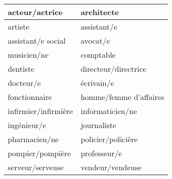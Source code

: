 \documentclass{article}
\date{}
\newcommand{\tabrowEnd}{\rule{0pt}{45pt}\\}
\begin{document}
  \centering
  \noindent
  {\LARGE
    \begin{tabular}{| p{} | p{} |}
      \hline
      acteur/actrice       & architecte \tabrowEnd
      \hline
      artiste              & assistant/e \tabrowEnd
      \hline
      assistant/e social   & avocat/e \tabrowEnd
      \hline
      musicien/ne          & comptable \tabrowEnd
      \hline
      dentiste             & directeur/directrice \tabrowEnd
      \hline
      docteur/e            & écrivain/e \tabrowEnd
      \hline
      fonctionnaire        & homme/femme d'affaires \tabrowEnd
      \hline
      infirmier/infirmière & informaticien/ne \tabrowEnd
      \hline
      ingénieur/e          & journaliste \tabrowEnd
      \hline
      pharmacien/ne        & policier/policière \tabrowEnd
      \hline
      pompier/pompière     & professeur/e \tabrowEnd
      \hline
      serveur/serveuse     & vendeur/vendeuse \tabrowEnd
      \hline
    \end{tabular}
  }
\end{document}

